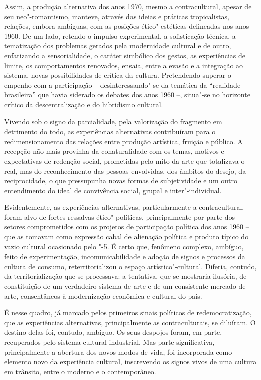 Assim, a produção alternativa dos anos 1970, mesmo a contracultural,
apesar de seu neo"-romantismo, manteve, através das ideias e práticas
tropicalistas, relações, embora ambíguas, com as posições
ético"-estéticas delineadas nos anos 1960. De um lado, retendo o impulso
experimental, a sofisticação técnica, a tematização dos problemas
gerados pela modernidade cultural e de outro, enfatizando a
sensorialidade, o caráter simbólico dos gestos, as experiências de
limite, os comportamentos renovados, ensaia, entre a evasão e a
integração ao sistema, novas possibilidades de crítica da cultura.
Pretendendo superar o empenho com a participação -- desinteressando"-se
da temática da ``realidade brasileira'' que havia siderado os debates
dos anos 1960 --, situa"-se no horizonte crítico da descentralização e do
hibridismo cultural.

Vivendo sob o signo da parcialidade, pela valorização do fragmento em
detrimento do todo, as experiências alternativas contribuíram para o
redimensionamento das relações entre produção artística, fruição e
público. A recepção não mais provinha da conaturalidade com os temas,
motivos e expectativas de redenção social, prometidas pelo mito da arte
que totalizava o real, mas do reconhecimento das pessoas envolvidas, dos
âmbitos do desejo, da reciprocidade, o que pressupunha novas formas de
subjetividade e um outro entendimento do ideal de convivência social,
grupal e inter"-individual.

Evidentemente, as experiências alternativas, particularmente a
contracultural, foram alvo de fortes ressalvas ético"-políticas,
principalmente por parte dos setores comprometidos com os projetos de
participação política dos anos 1960 -- que as tomavam como expressão
cabal de alienação política e produto típico do vazio cultural
ocasionado pelo "-5. É certo que, fenômeno complexo, ambíguo, feito de
experimentação, incomunicabilidade e adoção de signos e processos da
cultura de consumo, reterritorializou o espaço artístico"-cultural.
Diferia, contudo, da territorialização que se processava: a tentativa,
que se mostraria ilusória, de constituição de um verdadeiro sistema de
arte e de um consistente mercado de arte, consentâneos à modernização
econômica e cultural do país.

É nesse quadro, já marcado pelos primeiros sinais políticos de
redemocratização, que as experiências alternativas, principalmente as
contraculturais, se diluíram. O destino delas foi, contudo, ambíguo. Os
seus despojos foram, em parte, recuperados pelo sistema cultural
industrial. Mas parte significativa, principalmente a abertura dos novos
modos de vida, foi incorporada como elemento novo da experiência
cultural, inscrevendo os signos vivos de uma cultura em trânsito, entre
o moderno e o contemporâneo.

